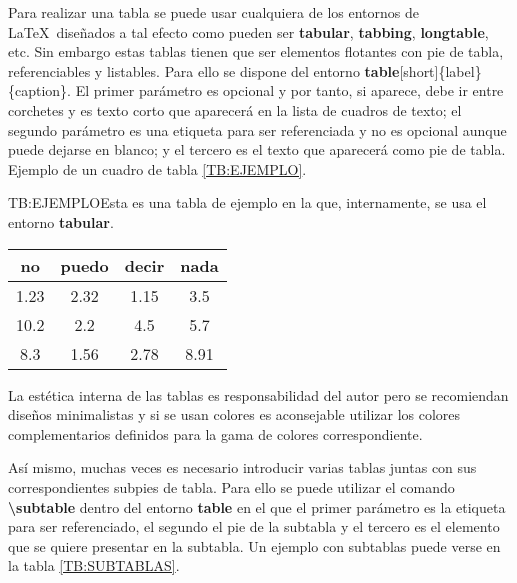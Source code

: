 Para realizar una tabla se puede usar cualquiera de los entornos de \LaTeX\ diseñados a tal efecto como pueden ser \textbf{tabular}, \textbf{tabbing}, \textbf{longtable}, etc. Sin embargo estas tablas tienen que ser elementos flotantes con pie de tabla, referenciables y listables. Para ello se dispone del entorno \textbf{table}{[short]}\{label\}\{caption\}. El primer parámetro es opcional y por tanto, si aparece, debe ir entre corchetes y es texto corto que aparecerá en la lista de cuadros de texto; el segundo parámetro es una etiqueta para ser referenciada y no es opcional aunque puede dejarse en blanco; y el tercero es el texto que aparecerá como pie de tabla. Ejemplo de un cuadro de tabla \ref{TB:EJEMPLO}.

\begin{table}[Tabla de ejemplo]{TB:EJEMPLO}{Esta es una tabla de ejemplo en la que, internamente, se usa el entorno \textbf{tabular}.}
  \begin{tabular}{cccc}
    \hline
    \textbf{no} & \textbf{puedo} & \textbf{decir} & \textbf{nada} \\
    \hline \hline
    1.23 & 2.32 & 1.15 & 3.5 \\
    10.2 & 2.2 & 4.5 & 5.7 \\
    8.3 & 1.56 & 2.78 & 8.91 \\
    \hline
  \end{tabular}
\end{table}

La estética interna de las tablas es responsabilidad del autor pero se recomiendan diseños minimalistas y si se usan colores es aconsejable utilizar los colores complementarios definidos para la gama de colores correspondiente.

Así mismo, muchas veces es necesario introducir varias tablas juntas con sus correspondientes subpies de tabla. Para ello se puede utilizar el comando \textbf{\textbackslash subtable} dentro del entorno \textbf{table} en el que el primer parámetro es la etiqueta para ser referenciado, el segundo el pie de la subtabla y el tercero es el elemento que se quiere presentar en la subtabla. Un ejemplo con subtablas puede verse en la tabla \ref{TB:SUBTABLAS}.

